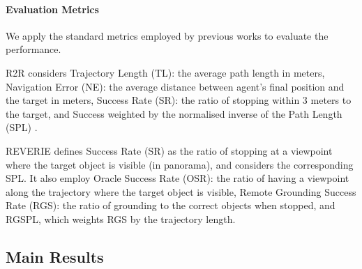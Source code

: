 \documentclass[final]{cvpr}
\begin{document}
\vspace{-5pt}
\paragraph{Evaluation Metrics} 
We apply the standard metrics employed by previous works to evaluate the performance.

R2R \cite{anderson2018vision} considers Trajectory Length (TL): the average path length in meters, Navigation Error (NE): the average distance between agent's final position and the target in meters, Success Rate (SR): the ratio of stopping within 3 meters to the target, and Success weighted by the normalised inverse of the Path Length (SPL) \cite{anderson2018evaluation}.

REVERIE \cite{qi2020reverie} defines Success Rate (SR) as the ratio of stopping at a viewpoint where the target object is visible (in panorama), and considers the corresponding SPL. It also employ Oracle Success Rate (OSR): the ratio of having a viewpoint along the trajectory where the target object is visible, Remote Grounding Success Rate (RGS): the ratio of grounding to the correct objects when stopped, and RGSPL, which weights RGS by the trajectory length.




\subsection{Main Results}
\end{document}
